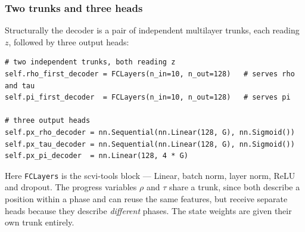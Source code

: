 \documentclass[11pt,a4paper]{article}
\theoremstyle{definition}
\begin{document}
\subsubsection{Two trunks and three heads}

Structurally the decoder is a pair of independent multilayer trunks, each
reading $z$, followed by three output heads:

\begin{lstlisting}
# two independent trunks, both reading z
self.rho_first_decoder = FCLayers(n_in=10, n_out=128)   # serves rho and tau
self.pi_first_decoder  = FCLayers(n_in=10, n_out=128)   # serves pi

# three output heads
self.px_rho_decoder = nn.Sequential(nn.Linear(128, G), nn.Sigmoid())
self.px_tau_decoder = nn.Sequential(nn.Linear(128, G), nn.Sigmoid())
self.px_pi_decoder  = nn.Linear(128, 4 * G)
\end{lstlisting}

Here \texttt{FCLayers} is the scvi-tools block --- Linear, batch norm, layer
norm, ReLU and dropout. The progress variables $\rho$ and $\tau$ share a trunk,
since both describe a position within a phase and can reuse the same features,
but receive separate heads because they describe \emph{different} phases. The
state weights are given their own trunk entirely.
\end{document}
